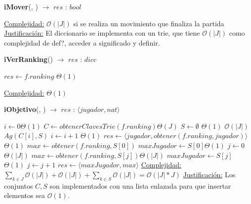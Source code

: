 \documentclass[10pt, a4paper]{article}
\newcommand{\bigO}{\mathcal{O}}
\begin{document}
\begin{Algoritmos}
\begin{algorithm}[H]{\textbf{iMover}(, ) $\to$ $res$ : $bool$}
\begin{algorithmic}[1]
                \medskip
                \Statex \underline{Complejidad:} $\bigO(|J|)$ si se realiza un movimiento que finaliza la partida
                \Statex \underline{Justificación:} El diccionario se implementa con un trie, que tiene $\bigO(|J|)$ como complejidad de def?, acceder a significado y definir.
            \end{algorithmic}
        \end{algorithm}
            
        
        \begin{algorithm}[H]{\textbf{iVerRanking}() $\to$ $res$ : $dicc$}
            \begin{algorithmic}[1]
                \State $res \gets f.ranking$	 \Comment $\Theta(1)$
            
                \medskip
                \Statex \underline{Complejidad:} $\Theta(1)$
                \end{algorithmic}
        \end{algorithm}	
        
        \begin{algorithm}[H]{\textbf{iObjetivo}(, ) $\to$ $res$ : $\langle jugador, nat\rangle$}
            \begin{algorithmic}[1]

                \State $i \gets 0$\Comment $\Theta(1)$
                \State $C \gets obtenerClavesTrie(f.ranking)$\Comment $\Theta(J)$
                \State $S \gets \emptyset$ \Comment $\Theta(1)$
                    		\Comment $\bigO(|J|)$
                    \State $Ag(C[i], S)$ 
                    \EndIf
                \State $i \gets i + 1$		\Comment $\Theta(1)$
                \EndWhile
                \State $res \gets \langle jugador, obtener(f.ranking, jugador)\rangle$	\Comment $\Theta(1)$
                \Else
                \State $max \gets obtener(f.ranking, S[0])$ \Comment{$\bigO(|J|)$}
                \State $maxJugador \gets S[0]$\Comment $\Theta(1)$
                \State $j \gets 0$
                \Comment $\Theta(|J|)$
                \State $max\gets obtener(f.ranking, S[j])$\Comment $\Theta(|J|)$
                \State $maxJugador\gets S[j]$\Comment $\Theta(1)$
                \EndIf
                \State $j\gets j+1$
                \EndWhile
                \State $res \gets \langle maxJugador, max\rangle$
                \EndIf
            \medskip
            \Statex \underline{Complejidad:} $\sum_{k\in J}\bigO(|J|)+\bigO(|J|)+\sum_{k\in S}\bigO(|J|)=\bigO(|J|*J)$
            \Statex \underline{Justificación:} Los conjuntos $C,S$ son implementados con una lista enlazada para que insertar elementos sea $\bigO(1)$.
            \end{algorithmic}
        \end{algorithm}	


\end{Algoritmos}
\end{document}
